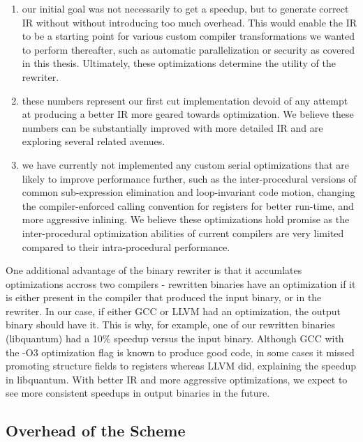 \begin{enumerate}

\item our initial goal was not necessarily to get a speedup, but to
generate correct IR without without introducing too much overhead. This would enable the IR to be a
starting point for various custom compiler transformations we wanted to perform thereafter, such as
automatic parallelization or security as covered in this thesis. Ultimately, these optimizations
determine the utility of the rewriter. 

\item these numbers represent our first cut implementation devoid of any attempt at producing a
better IR more geared towards optimization. We believe these numbers can be substantially improved
with more detailed IR and are exploring several related avenues. 

\item we have currently not implemented any custom serial optimizations that are likely to improve
performance further, such as the inter-procedural versions of common sub-expression elimination and
loop-invariant code motion, changing the compiler-enforced calling convention for registers for
better run-time, and more aggressive inlining. We believe these optimizations hold promise as the
inter-procedural optimization abilities of current compilers are very limited compared to their
intra-procedural performance.

\end{enumerate}

One additional advantage of the binary rewriter is that it accumlates optimizations accross two
compilers - rewritten binaries have an optimization if it is either present in the compiler that
produced the input binary, or in the rewriter. In our case, if either GCC or LLVM had an
optimization, the output binary should have it. This is why, for example, one of our rewritten
binaries (libquantum) had a 10\% speedup versus the input binary. Although GCC with the -O3
optimization flag is known to produce good code, in some cases it missed promoting structure fields
to registers whereas LLVM did, explaining the speedup in libquantum. With better IR and more
aggressive optimizations, we expect to see more consistent speedups in output binaries in the
future.


\subsection{Overhead of the Scheme}

